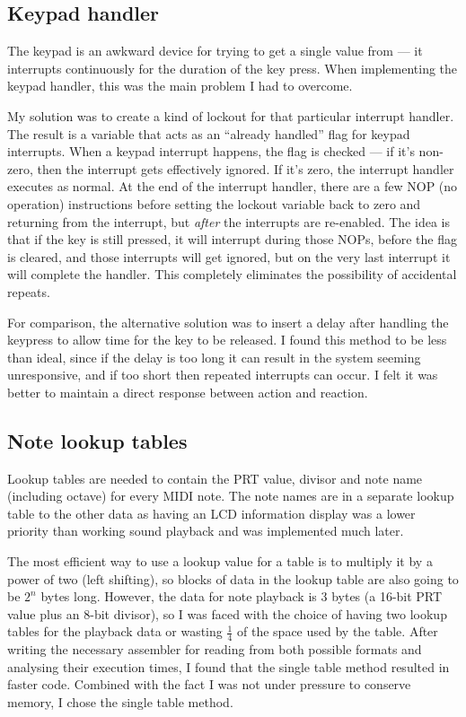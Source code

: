 \subsection{Keypad handler}
\label{sec:design:keypad_handler}

The keypad is an awkward device for trying to get a single value from --- it interrupts continuously 
for the duration of the key press.  When implementing the keypad handler, this was the main problem 
I had to overcome.

My solution was to create a kind of lockout for that particular interrupt handler.  The result is a 
variable that acts as an ``already handled'' flag for keypad interrupts.  When a keypad interrupt 
happens, the flag is checked --- if it's non-zero, then the interrupt gets effectively ignored.  If 
it's zero, the interrupt handler executes as normal.  At the end of the interrupt handler, there are 
a few NOP (no operation) instructions before setting the lockout variable back to zero and returning 
from the interrupt, but \emph{after} the interrupts are re-enabled.  The idea is that if the key is 
still pressed, it will interrupt during those NOPs, before the flag is cleared, and those interrupts 
will get ignored, but on the very last interrupt it will complete the handler.  This completely 
eliminates the possibility of accidental repeats.

For comparison, the alternative solution was to insert a delay after handling the keypress to allow 
time for the key to be released.  I found this method to be less than ideal, since if the delay is 
too long it can result in the system seeming unresponsive, and if too short then repeated interrupts 
can occur.  I felt it was better to maintain a direct response between action and reaction.

\subsection{Note lookup tables}
\label{notelookuptables}

Lookup tables are needed to contain the PRT value, divisor and note name (including octave) for 
every MIDI note.  The note names are in a separate lookup table to the other data as having an LCD 
information display was a lower priority than working sound playback and was implemented much later.

The most efficient way to use a lookup value for a table is to multiply it by a power of two (left 
shifting), so blocks of data in the lookup table are also going to be $2^n$ bytes long.  However, 
the data for note playback is 3 bytes (a 16-bit PRT value plus an 8-bit divisor), so I was faced 
with the choice of having two lookup tables for the playback data or wasting $\frac{1}{4}$ of the 
space used by the table.  After writing the necessary assembler for reading from both possible 
formats and analysing their execution times, I found that the single table method resulted in faster 
code.  Combined with the fact I was not under pressure to conserve memory, I chose the single table 
method.


